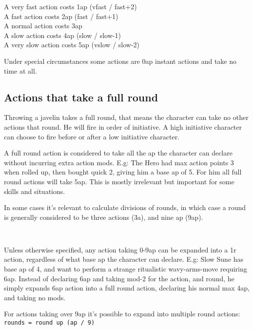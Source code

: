 \noindent
A very fast action costs 1ap (vfast / fast+2) \\
A fast action costs 2ap (fast / fast+1) \\
A normal action costs 3ap \\
A slow action costs 4ap (slow / slow-1) \\
A very slow action costs 5ap (vslow / slow-2)

\noindent
Under special circumstances some actions are 0ap instant actions and take no time at all.


\subsection*{Actions that take a full round}
\label{fullroundactions}
Throwing a javelin takes a full round, that means the character can take no other actions that round. He will fire in order of initiative. A high initiative character can choose to fire before or after a low initiative character.

A full round action is considered to take all the ap the character can declare without incurring extra action mods. E.g: The Hero had max action points 3 when rolled up, then bought quick 2, giving him a base ap of 5. For him all full round actions will take 5ap. This is mostly irrelevant but important for some skills and situations.

In some cases it's relevant to calculate divisions of rounds, in which case a round is generally considered to be three actions (3a), and nine ap (9ap). 


\

Unless otherwise specified, any action taking 0-9ap can be expanded into a 1r action, regardless of what base ap the character can declare. E.g: Slow Sune has base ap of 4, and want to perform a strange ritualistic wavy-arms-move requiring 6ap. Instead of declaring 6ap and taking mod-2 for the action, and round, he simply expands 6ap action into a full round action, declaring his normal max 4ap, and taking no mods.

For actions taking over 9ap it's possible to expand into multiple round actions:\\
\verb|rounds = round up (ap / 9)|


